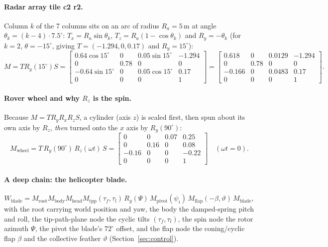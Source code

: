 \paragraph{Radar array tile c2 r2.} Column $k$ of the 7 columns sits on an arc of radius $R_a=5$\,m at angle
$\theta_k=(k-4)\cdot7.5^\circ$: $T_x=R_a\sin\theta_k$, $T_z=R_a(1-\cos\theta_k)$ and $R_y=-\theta_k$ (for $k=2$,
$\theta=-15^\circ$, giving $T=(-1.294,0,0.17)$ and $R_y=15^\circ$):
\begin{equation}
M=T R_y(15^\circ)S=\begin{bmatrix}0.64\cos15^\circ&0&0.05\sin15^\circ&-1.294\\0&0.78&0&0\\-0.64\sin15^\circ&0&0.05\cos15^\circ&0.17\\0&0&0&1\end{bmatrix}
=\begin{bmatrix}0.618&0&0.0129&-1.294\\0&0.78&0&0\\-0.166&0&0.0483&0.17\\0&0&0&1\end{bmatrix}.
\end{equation}

\paragraph{Rover wheel and why $R_z$ is the spin.} Because $M=T R_y R_x R_z S$, a cylinder (axis $z$) is scaled
first, then spun about its own axis by $R_z$, \emph{then} turned onto the $x$ axis by $R_y(90^\circ)$:
\begin{equation}
M_\text{wheel}=T\,R_y(90^\circ)\,R_z(\omega t)\,S=
\begin{bmatrix}0&0&0.07&0.25\\0&0.16&0&0.08\\-0.16&0&0&-0.22\\0&0&0&1\end{bmatrix}\quad(\omega t=0).
\end{equation}

\paragraph{A deep chain: the helicopter blade.}
\begin{equation}
W_\text{blade}=M_\text{root}M_\text{body}M_\text{head}M_\text{tpp}(\tau_f,\tau_l)\,R_y(\Psi)\,M_\text{pivot}(\psi_i)\,
M_\text{flap}(-\beta,\vartheta)\,M_\text{blade},
\end{equation}
with the root carrying world position and yaw, the body the damped-spring pitch and roll, the tip-path-plane node
the cyclic tilts $(\tau_f,\tau_l)$, the spin node the rotor azimuth $\Psi$, the pivot the blade's $72^\circ$ offset,
and the flap node the coning/cyclic flap $\beta$ and the collective feather $\vartheta$ (Section~\ref{sec:control}).

